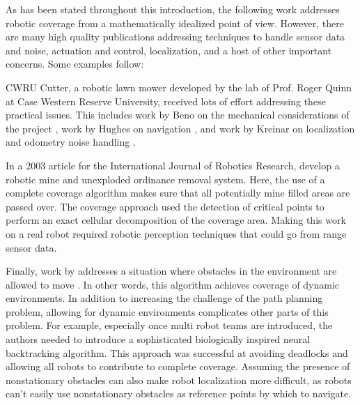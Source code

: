 As has been stated throughout this introduction, the following work addresses robotic coverage from a mathematically idealized point of view. However, there are many high quality publications addressing techniques to handle sensor data and noise, actuation and control, localization, and a host of other important concerns. Some examples follow:

CWRU Cutter, a robotic lawn mower developed by the lab of Prof. Roger Quinn at Case Western Reserve University, received lots of effort addressing these practical issues. This includes work by Beno on the mechanical considerations of the project \cite{Beno}, work by Hughes on navigation \cite{Hughes}, and work by Kreinar on localization and odometry noise handling \cite{Kreinar}.

In a 2003 article for the International Journal of Robotics Research, \citeauthor{Acar} develop a robotic mine and unexploded ordinance removal system. Here, the use of a complete coverage algorithm makes sure that all potentially mine filled areas are passed over. The coverage approach used the detection of critical points to perform an exact cellular decomposition of the coverage area. Making this work on a real robot required robotic perception techniques that could go from range sensor data.

Finally, work by \citeauthor{Liu} addresses a situation where obstacles in the environment are allowed to move \cite{Liu}. In other words, this algorithm achieves coverage of dynamic environments. In addition to increasing the challenge of the path planning problem, allowing for dynamic environments complicates other parts of this problem. For example, especially once multi robot teams are introduced, the authors needed to introduce a sophisticated biologically inspired neural backtracking algorithm. This approach was successful at avoiding deadlocks and allowing all robots to contribute to complete coverage. Assuming the presence of nonstationary obstacles can also make robot localization more difficult, as robots can't easily use nonstationary obstacles as reference points by which to navigate.